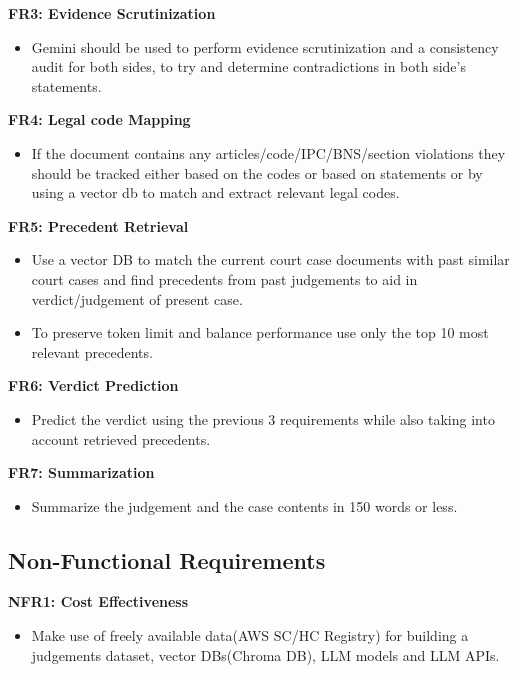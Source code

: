 \textbf{FR3: Evidence Scrutinization}
\begin{itemize}
    \item Gemini should be used to perform evidence scrutinization and a consistency audit for both sides, to try and determine contradictions in both side’s statements.
\end{itemize}

\textbf{FR4: Legal code Mapping}
\begin{itemize}
    \item If the document contains any articles/code/IPC/BNS/section violations they should be tracked either based on the codes or based on statements or by using a vector db to match and extract relevant legal codes.
\end{itemize}

\textbf{FR5: Precedent Retrieval}
\begin{itemize}
    \item Use a vector DB to match the current court case documents with past similar court cases and find precedents from past judgements to aid in verdict/judgement of present case.
    \item To preserve token limit and balance performance use only the top 10 most relevant precedents.
\end{itemize}

\textbf{FR6: Verdict Prediction}
\begin{itemize}
	\item Predict the verdict using the previous 3 requirements while also taking into account retrieved precedents.

\end{itemize}

\textbf{FR7: Summarization}
\begin{itemize}
	\item Summarize the judgement and the case contents in 150 words or less.

\end{itemize}

\subsection{Non-Functional Requirements}

\textbf{NFR1: Cost Effectiveness}
\begin{itemize}
    \item Make use of freely available data(AWS SC/HC Registry) for building a judgements dataset, vector DBs(Chroma DB), LLM models and LLM APIs.
\end{itemize}

